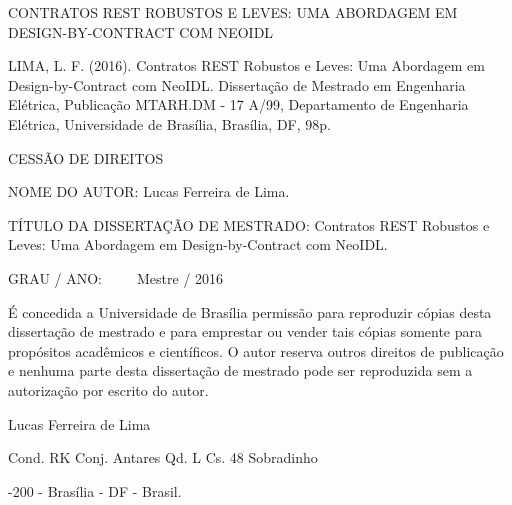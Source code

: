 \vspace{-1mm}

\noindent CONTRATOS REST ROBUSTOS E LEVES: UMA ABORDAGEM EM
DESIGN-BY-CONTRACT COM NEOIDL

\noindent  LIMA, L. F. (2016). Contratos REST Robustos e Leves: Uma
Abordagem em Design-by-Contract com NeoIDL. Dissertação de Mestrado em
Engenharia Elétrica, Publicação MTARH.DM - 17 A/99, Departamento de Engenharia Elétrica,
Universidade de Brasília, Brasília, DF, 98p.



\vspace{6mm}

\noindent \begin{bf} \MakeUppercase{Cessão de Direitos} \end{bf}

\vspace{5mm}

\noindent NOME DO AUTOR: Lucas Ferreira de Lima.
\vspace{6mm}

\noindent TÍTULO DA DISSERTAÇÃO DE MESTRADO: Contratos REST Robustos e Leves: Uma
Abordagem em Design-by-Contract com NeoIDL. 

\vspace{3mm}
\noindent GRAU / ANO:~ ~ ~ Mestre / 2016

\vspace{5mm}

\noindent É concedida a Universidade de Brasília permissão para reproduzir
cópias desta dissertação de mestrado e para emprestar ou vender tais cópias
somente para propósitos acadêmicos e científicos. O autor reserva outros
direitos de publicação e nenhuma parte desta dissertação de mestrado pode ser
reproduzida sem a autorização por escrito do autor.

\vspace{5mm}

\noindent \underline{\hspace{65mm}}

\vspace{-2mm}

\noindent  Lucas Ferreira de Lima
   \vspace{-2mm}

\noindent Cond. RK Conj. Antares Qd. L Cs. 48 Sobradinho 
    \vspace{-2mm}
    
-200 - Brasília - DF - Brasil.

\pagebreak


